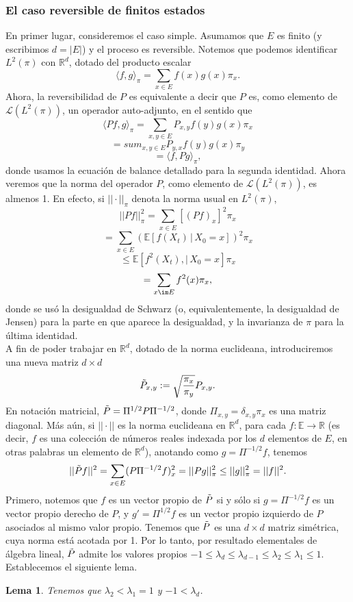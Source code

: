\documentclass[a4paper]{article}
\newtheorem{lem}{Lema}
\numberwithin{equation}{subsection}
\numberwithin{definicion}{subsection}
\def\R{\mathbb R}
\def\E{\mathbb E}
\begin{document}
\subsubsection{El caso reversible de finitos estados}
En primer lugar, consideremos el caso simple. Asumamos que $E$ es finito (y escribimos $d=|E|$) y el proceso es reversible. Notemos que podemos identificar $L^2(\pi)$ con $\R^d$, dotado  del producto escalar
\[\langle f,g \rangle_{\pi} = \sum_{x\in E}f(x)g(x)\pi_x.\]
Ahora, la reversibilidad de $P$ es equivalente a decir que $P$ es, como elemento de $\mathcal{L}(L^2(\pi))$, un operador auto-adjunto, en el sentido que
\[\langle Pf,g\rangle_{\pi} = \sum_{x,y\in E}P_{x,y}f(y)g(x)\pi_x\]
\[= sum_{x,y\in E}P_{y,x}f(y)g(x)\pi_y\]
\[= \langle f,Pg \rangle_{\pi},\]
donde usamos la ecuación de balance detallado para la segunda identidad. Ahora veremos que la norma del operador $P$, como elemento de $\mathcal{L}(L^2(\pi))$, es almenos 1. En efecto, si $||\cdot ||_{\pi}$ denota la norma usual en $L^2(\pi)$,
\[||Pf||_{\pi}^2 = \sum_{x\in E}\left[(Pf)_x\right]^2\pi_x\]
\[ = \sum_{x\in E}(\E[f(X_t)\,|\,X_0=x])^2\pi_x\]
\[\leq \E[f^2(X_t),|\,X_0=x]\pi_x\]
\[=\sum_{x\im E}f^2(x)\pi_x,\]
donde se usó la desigualdad de Schwarz (o, equivalentemente, la desigualdad de Jensen) para la parte en que aparece la desigualdad, y la invarianza de $\pi$ para la última identidad.\\
A fin de poder trabajar en $\R^d$, dotado de la norma euclideana, introduciremos una nueva matriz $d\times d$
\[\Tilde{P}_{x,y} := \sqrt{\frac{\pi_x}{\pi_y}}P_{x,y}.\]
En notación matricial, $\Tilde{P}=\Pi^{1/2}P\Pi^{-1/2}$, donde $\Pi_{x,y} = \delta_{x,y}\pi_x$ es una matriz diagonal. Más aún, si $||\cdot ||$ es la norma euclideana en $\R^d$, para cada $f:\E\rightarrow \R$ (es decir, $f$ es una colección de números reales indexada por los $d$ elementos de $E$, en otras palabras un elemento de $\R^d$), anotando como $g = \Pi^{-1/2}f$, tenemos
\[||\Tilde{P}f||^2 = \sum_{x\in E}(P\Pi^{-1/2}f)_x^2 = ||Pg||_{\pi}^2 \leq ||g||_{\pi}^2 = ||f||^2.\]
Primero, notemos que $f$ es un vector propio de $\Tilde{P}$ si y sólo si $g=\Pi^{-1/2}f$ es un vector propio derecho de $P$, y $g' = \Pi^{1/2}f$ es un vector propio izquierdo de $P$ asociados al mismo valor propio. Tenemos que $\Tilde{P}$ es una $d\times d$ matriz simétrica, cuya norma está acotada por 1. Por lo tanto, por resultado elementales de álgebra lineal, $\Tilde{P}$ admite los valores propios $-1\leq \lambda_d \leq \lambda_{d-1}\leq \lambda_2\leq \lambda_1\leq 1$. Establecemos el siguiente lema.
\begin{lem}
Tenemos que $\lambda_2 <\lambda_1 = 1$ y $-1<\lambda_d$.
\end{lem}
\end{document}
